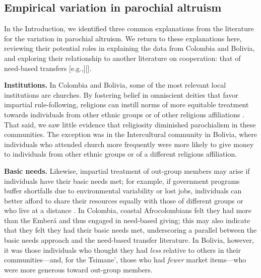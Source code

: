 \documentclass[bibauthoryear]{aa}
\begin{document}
\subsection{Empirical variation in parochial altruism}

In the Introduction, we identified three common explanations from the literature for the variation in parochial altruism. We return to these explanations here, reviewing their potential roles in explaining the data from Colombia and Bolivia, and exploring their relationship to another literature on cooperation: that of need-based transfers [e.g.,][]\citep{peterson1993demand, hooper2015inclusive, aktipis2016cooperation, hao2015need, gervais2017rich, cronk2019managing}.

\textbf{Institutions.} In Colombia and Bolivia, some of the most relevant local institutions are churches. By fostering belief in omniscient deities that favor impartial rule-following, religions can instill norms of more equitable treatment towards individuals from other ethnic groups or of other religious affiliations \citep{purzycki2018evolution, lang2019moralizing}. That said, we saw little evidence that religiosity diminished parochialism in these communities. The exception was in the Intercultural community in Bolivia, where individuals who attended church more frequently were more likely to give money to individuals from other ethnic groups or of a different religious affiliation.

\textbf{Basic needs.} Likewise, impartial treatment of out-group members may arise if individuals have their basic needs met; for example, if government programs buffer shortfalls due to environmental variability or lost jobs, individuals can better afford to share their resources equally with those of different groups or who live at a distance \citep{hruschka2014impartial, silva2014cooperation}. In Colombia, coastal Afrocolombians felt they had more than the Ember\'a and thus engaged in need-based giving; this may also indicate that they felt they had their basic needs met, underscoring a parallel between the basic needs approach and the need-based transfer literature. In Bolivia, however, it was those individuals who thought they had \emph{less} relative to others in their communities---and, for the Tsimane', those who had \emph{fewer} market items---who were more generous toward out-group members.
\end{document}
